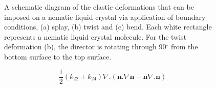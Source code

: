 \begin{figure}
\begin{center}
\hspace{0.2cm}
\hspace{0.2cm}
\hspace{0.2cm}
\end{center}
\caption[Schematic depiction of the splay, twist and bend elastic deformations]{\label{fig:s,t,b}A schematic diagram of the elastic deformations that can be imposed on a nematic liquid crystal via application of boundary conditions, (a) splay, (b) twist and (c) bend. Each white rectangle represents a nematic liquid crystal molecule. For the twist deformation (b), the director is rotating through 90$^{\circ}$ from the bottom surface to the top surface.}
\end{figure}



\begin{equation}
\frac{1}{2}\left(k_{22}+k_{24}\right)\nabla.\left(\bm{n}.\nabla\bm{n}-\bm{n}\nabla.\bm{n}\right)
\end{equation}

